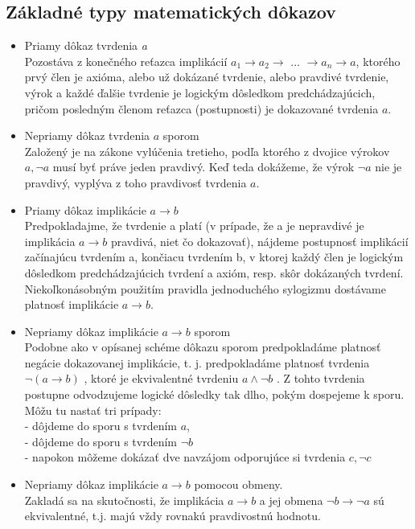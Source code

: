   \subsection{Základné typy matematických dôkazov}
    \begin{itemize}
    \item Priamy dôkaz tvrdenia \textit{a}\\
      Pozostáva z konečného reťazca implikácií $ a_{1} \rightarrow a_{2} \rightarrow$ ... $\rightarrow a_{n} \rightarrow a $, ktorého prvý člen je axióma, alebo už dokázané tvrdenie, alebo pravdivé tvrdenie, výrok a každé ďalšie tvrdenie je logickým dôsledkom predchádzajúcich, pričom posledným členom reťazca (postupnosti) je dokazované tvrdenia $a$.
    \item Nepriamy dôkaz tvrdenia $a$ sporom\\
      Založený je na zákone vylúčenia tretieho, podľa ktorého z dvojice výrokov $a, \neg a$ musí byť práve jeden pravdivý. Keď teda dokážeme, že výrok $\neg a$ nie je pravdivý, vyplýva z toho pravdivosť tvrdenia $a$.
    \item Priamy dôkaz implikácie $ a \rightarrow b$\\
      Predpokladajme, že tvrdenie a platí (v prípade, že a je nepravdivé je implikácia $a \rightarrow b$ pravdivá, niet čo dokazovať), nájdeme postupnosť implikácií začínajúcu tvrdením a, končiacu tvrdením b, v ktorej každý člen je logickým dôsledkom predchádzajúcich tvrdení a axióm, resp. skôr dokázaných tvrdení. Niekoľkonásobným použitím pravidla jednoduchého sylogizmu dostávame platnosť implikácie $a \rightarrow b$.

    \item Nepriamy dôkaz implikácie $ a \rightarrow b$ sporom\\
      Podobne ako v opísanej schéme dôkazu sporom predpokladáme platnosť negácie dokazovanej implikácie, t. j. predpokladáme platnosť tvrdenia $\neg ( a \rightarrow b)$ , ktoré je ekvivalentné tvrdeniu $a \wedge \neg b$ . Z tohto tvrdenia postupne odvodzujeme logické dôsledky tak dlho, pokým dospejeme k sporu. Môžu tu nastať tri prípady:\\
      - dôjdeme do sporu s tvrdením $a$,\\
      - dôjdeme do sporu s tvrdením $\neg b$\\
      - napokon môžeme dokázať dve navzájom odporujúce si tvrdenia $c, \neg c$

    \item Nepriamy dôkaz implikácie $a \rightarrow b$ pomocou obmeny.\\
      Zakladá sa na skutočnosti, že implikácia $ a \rightarrow b$ a jej obmena $ \neg b \rightarrow \neg a $ sú ekvivalentné, t.j. majú vždy rovnakú pravdivostnú hodnotu.


\end{itemize}
